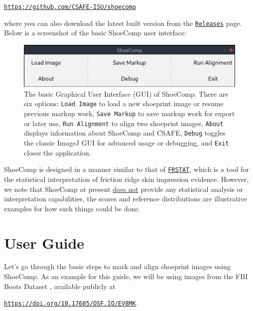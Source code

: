 \documentclass[a4paper, oneside]{memoir}
\newcommand{\selfref}[1]{\texttt{\href{#1}{#1}}}
\newcommand{\rref}[2]{\texttt{\href{#2}{#1}}}
\begin{document}
\begin{center}
\selfref{https://github.com/CSAFE-ISU/shoecomp}
\end{center}

where you can also download the latest built version from the
\rref{Releases}{https://github.com/CSAFE-ISU/shoecomp/releases} page. Below is a
screenshot of the basic ShoeComp user interface:

\begin{figure}[htbp]
\begin{center}
	\includegraphics[width=0.8\linewidth]{images/shoecomp.png}
\end{center}
\caption{The basic Graphical User Interface (GUI) of ShoeComp. There are six options:
\texttt{Load Image} to load a new shoeprint image or resume previous markup work, \texttt{Save
Markup} to save markup work for export or later use, \texttt{Run Alignment} to align two
shoeprint images, \texttt{About} displays information about ShoeComp and CSAFE,
\texttt{Debug} toggles the classic ImageJ GUI for advanced usage or debugging, and
\texttt{Exit} closes the application.}
\label{fig:shoecomp_base}
\end{figure}


ShoeComp is designed in a manner similar to that of
\rref{FRSTAT}{https://zenodo.org/records/4426484}, which is a tool for the statistical
interpretation of friction ridge skin impression evidence. However, we note that ShoeComp
at present \underline{does not} provide any statistical analysis or interpretation
capabilities, the scores and reference distributions are illustrative examples for how
such things could be done.

\newpage
\chapter{User Guide}%
\label{sec:userguide}

Let's go through the basic steps to mark and align shoeprint images using ShoeComp. As an
example for this guide, we will be using images from the FBI Boots Dataset \cite{boots}, available
publicly at

\begin{center}
\selfref{https://doi.org/10.17605/OSF.IO/EV8MK}. 
\end{center}
\end{document}
